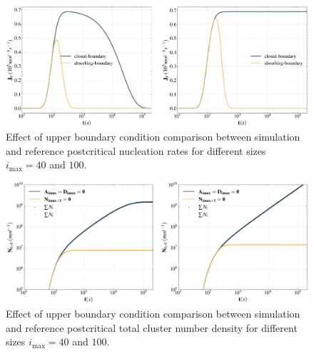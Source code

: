 \begin{figure}[H]
    \centering
    \hspace*{-2cm} %
    \includegraphics[width=1.2\linewidth]{laszlo_results/nucleation_rates.png}
    \caption{Effect of upper boundary condition comparison between simulation and reference postcritical nucleation rates for different sizes $i_{\text{max}} = 40$ and $100$.}
    \label{fig:nucleation_rates}
\end{figure}

\begin{figure}[H]
    \centering
    \hspace*{-2cm} %
    \includegraphics[width=1.2\linewidth]{laszlo_results/number_comparison.png}
    \caption{Effect of upper boundary condition comparison between simulation and reference postcritical total cluster number density for different sizes $i_{\text{max}} = 40$ and $100$.}
    \label{fig:number_comparison}
\end{figure}

